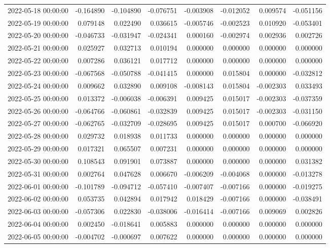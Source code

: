 \begin{tabular}{lrrrrrrr}
2022-05-18 00:00:00 & -0.164890 & -0.104890 & -0.076751 & -0.003908 & -0.012052 & 0.009574 & -0.051156 \\
2022-05-19 00:00:00 & 0.079148 & 0.022490 & 0.036615 & -0.005746 & -0.002523 & 0.010920 & -0.053401 \\
2022-05-20 00:00:00 & -0.046733 & -0.031947 & -0.024341 & 0.000160 & -0.002974 & 0.002936 & 0.002726 \\
2022-05-21 00:00:00 & 0.025927 & 0.032713 & 0.010194 & 0.000000 & 0.000000 & 0.000000 & 0.000000 \\
2022-05-22 00:00:00 & 0.007286 & 0.036121 & 0.017712 & 0.000000 & 0.000000 & 0.000000 & 0.000000 \\
2022-05-23 00:00:00 & -0.067568 & -0.050788 & -0.041415 & 0.000000 & 0.015804 & 0.000000 & -0.032812 \\
2022-05-24 00:00:00 & 0.009662 & 0.032890 & 0.009108 & -0.008143 & 0.015804 & -0.002303 & 0.033493 \\
2022-05-25 00:00:00 & 0.013372 & -0.006038 & -0.006391 & 0.009425 & 0.015017 & -0.002303 & -0.037359 \\
2022-05-26 00:00:00 & -0.064766 & -0.060861 & -0.032839 & 0.009425 & 0.015017 & -0.002303 & -0.031150 \\
2022-05-27 00:00:00 & -0.062765 & -0.032709 & -0.028695 & 0.009425 & 0.015017 & 0.000700 & -0.066920 \\
2022-05-28 00:00:00 & 0.029732 & 0.018938 & 0.011733 & 0.000000 & 0.000000 & 0.000000 & 0.000000 \\
2022-05-29 00:00:00 & 0.017321 & 0.065507 & 0.007231 & 0.000000 & 0.000000 & 0.000000 & 0.000000 \\
2022-05-30 00:00:00 & 0.108543 & 0.091901 & 0.073887 & 0.000000 & 0.000000 & 0.000000 & 0.031382 \\
2022-05-31 00:00:00 & 0.002764 & 0.047628 & 0.006670 & -0.006209 & -0.004068 & 0.000000 & -0.013278 \\
2022-06-01 00:00:00 & -0.101789 & -0.094712 & -0.057410 & -0.007407 & -0.007166 & 0.000000 & -0.019275 \\
2022-06-02 00:00:00 & 0.053735 & 0.042894 & 0.017942 & 0.018429 & -0.007166 & 0.000000 & -0.038491 \\
2022-06-03 00:00:00 & -0.057306 & 0.022830 & -0.038006 & -0.016414 & -0.007166 & 0.009069 & 0.002826 \\
2022-06-04 00:00:00 & 0.002450 & -0.018641 & 0.005883 & 0.000000 & 0.000000 & 0.000000 & 0.000000 \\
2022-06-05 00:00:00 & -0.004702 & -0.000697 & 0.007622 & 0.000000 & 0.000000 & 0.000000 & 0.000000 \\

\end{tabular}

